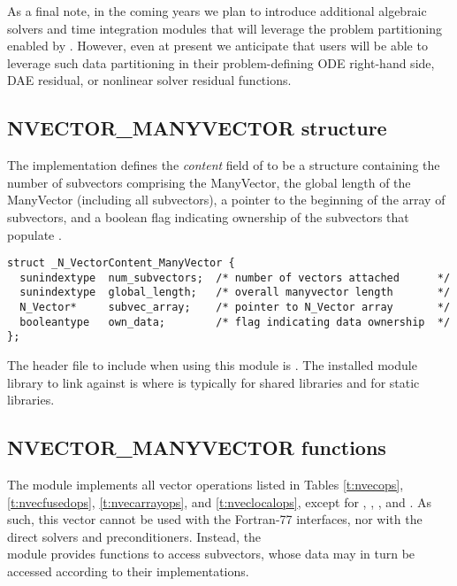 As a final note, in the coming years we plan to introduce additional
algebraic solvers and time integration modules that will leverage the
problem partitioning enabled by {\nvecmanyvector}.  However, even at
present we anticipate that users will be able to leverage such data
partitioning in their problem-defining ODE right-hand side, DAE
residual, or nonlinear solver residual functions.


\subsection{NVECTOR\_MANYVECTOR structure}
\label{ss:nvec_manyvector_structure}

The {\nvecmanyvector} implementation defines the {\em content} field
of  to be a structure containing the number of
subvectors comprising the ManyVector, the global length of the
ManyVector (including all subvectors), a pointer to
the beginning of the array of subvectors, and a boolean flag
 indicating ownership of the subvectors that populate
.
\begin{verbatim} 
struct _N_VectorContent_ManyVector {
  sunindextype  num_subvectors;  /* number of vectors attached      */
  sunindextype  global_length;   /* overall manyvector length       */
  N_Vector*     subvec_array;    /* pointer to N_Vector array       */
  booleantype   own_data;        /* flag indicating data ownership  */
};
\end{verbatim}

The header file to include when using this module is
. The installed module library to link against is
 where  is typically
 for shared libraries and  for static libraries.



\subsection{NVECTOR\_MANYVECTOR functions}
\label{ss:nvec_manyvector_functions}

The {\nvecmanyvector} module implements all vector operations listed 
in Tables \ref{t:nvecops}, \ref{t:nvecfusedops}, \ref{t:nvecarrayops},
and \ref{t:nveclocalops}, except for ,
, , and
.  As such, this vector cannot be
used with the {\sundials} Fortran-77 interfaces, nor with the
{\sundials} direct solvers and preconditioners. Instead, the \\
{\nvecmanyvector} module provides functions to access subvectors,
whose data may in turn be accessed according to their {\nvector}
implementations.

